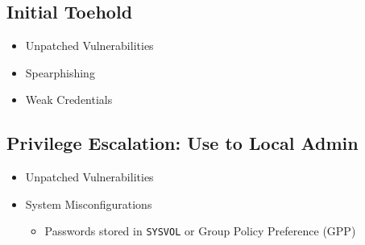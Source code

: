 \subsection{Initial Toehold}
\begin{itemize}
    \item Unpatched Vulnerabilities
    \item Spearphishing
    \item Weak Credentials
\end{itemize}

\subsection{Privilege Escalation: Use to Local Admin}
\begin{itemize}
    \item Unpatched Vulnerabilities
    \item System Misconfigurations
    \begin{itemize}
        \item Passwords stored in \texttt{SYSVOL} or Group Policy Preference (GPP)
    \end{itemize}
\end{itemize}

